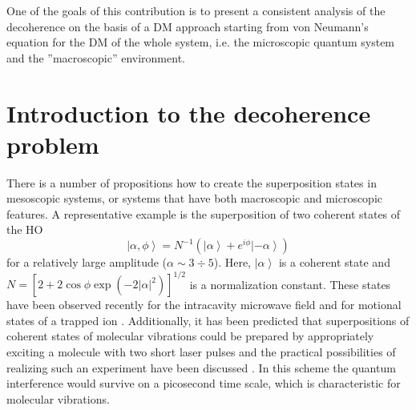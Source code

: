 \documentclass[12pt,twoside,a4paper]{report}
\begin{document}
One of the goals of this contribution is to present a consistent
analysis of the decoherence on the basis of a DM approach
starting from von Neumann's equation for the DM of 
the whole system,
i.e. the microscopic quantum system and the ''macroscopic''
environment.



\section{Introduction to the decoherence problem} \label{intr-dec}
There is a number of propositions how to create the
superposition states in mesoscopic systems, or systems that have both
macroscopic and microscopic features. 
A representative example
is the superposition of two coherent states of the HO
\begin{equation}
  \left| \alpha ,\phi \right\rangle =N^{-1}\left( \left| \alpha
    \right\rangle +e^{{{i}}\phi }\left| -\alpha \right\rangle \right)
  \label{superpositional-state-Eq}
\end{equation}
for a relatively large amplitude ($\alpha \sim 3\div 5$). Here,
$\left| \alpha \right\rangle $ is a coherent state and 
$N=\left[
          2+2\cos \phi \exp \left( -2
                                    \left| 
                                           \alpha 
                                    \right|^2
                              \right) 
   \right]^{1/2}$
is a normalization constant. These states have been observed
recently for the intracavity microwave field \cite{5} and for motional
states of a trapped ion \cite{6}. Additionally, it has been predicted
that superpositions of coherent states of molecular vibrations could
be prepared by appropriately exciting a molecule with two short laser
pulses \cite{7} and the practical possibilities of realizing such an
experiment have been discussed \cite{8}.  In this scheme the quantum
interference would survive on a picosecond time scale, which is
characteristic for molecular vibrations.  
\end{document}
